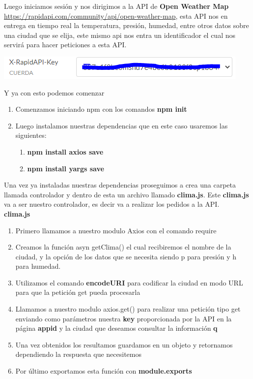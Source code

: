 \documentclass{report}
\begin{document}
    Luego iniciamos sesión y nos dirigimos a la API de \textbf{ Open Weather Map} \url{https://rapidapi.com/community/api/open-weather-map}, esta API nos en entrega en tiempo real la temperatura, presión, humedad, entre otros datos
    sobre una ciudad que se elija, este mismo api nos entra un identificador el cual nos servirá para hacer peticiones a esta API.
    \begin{center}
        \includegraphics[scale=0.9]{key.PNG}
      \end{center}
      Y ya con esto podemos comenzar
    \begin{enumerate}
        \item Comenzamos iniciando npm con los comandos \textbf{npm init}
        \item Luego instalamos nuestras dependencias que en este caso usaremos las siguientes:
        \begin{enumerate}
            \item \textbf{npm install axios \-\-save}
            \item \textbf{npm install yargs \-\-save}
        \end{enumerate}
    \end{enumerate}
    Una vez ya instaladas nuestras dependencias proseguimos a crea una carpeta llamada controlador y dentro de esta un archivo llamado \textbf{clima.js}.
    Este \textbf{clima.js} va a ser nuestro controlador, es decir va a realizar los pedidos a la API.
    \\
    \textbf{clima.js}
    \begin{enumerate}
        \item Primero llamamos a nuestro modulo Axios con el comando require
        \item Creamos la función asyn getClima() el cual recibiremos el nombre de la ciudad, y la opción de los datos que se necesita siendo p para presión y h para humedad.
        \item Utilizamos el comando \textbf{encodeURI} para codificar la ciudad en modo URL para que la petición get pueda procesarla
        \item Llamamos a nuestro modulo axios.get() para realizar una petición tipo get enviando como parámetros nuestra \textbf{key} proporcionada por la API en la página \textbf{appid} y la ciudad que deseamos consultar la información \textbf{q}
        \item Una vez obtenidos los resultamos guardamos en un objeto y retornamos dependiendo la respuesta que necesitemos
        \item Por último exportamos esta función con \textbf{module.exports}
    \end{enumerate}
\end{document}
